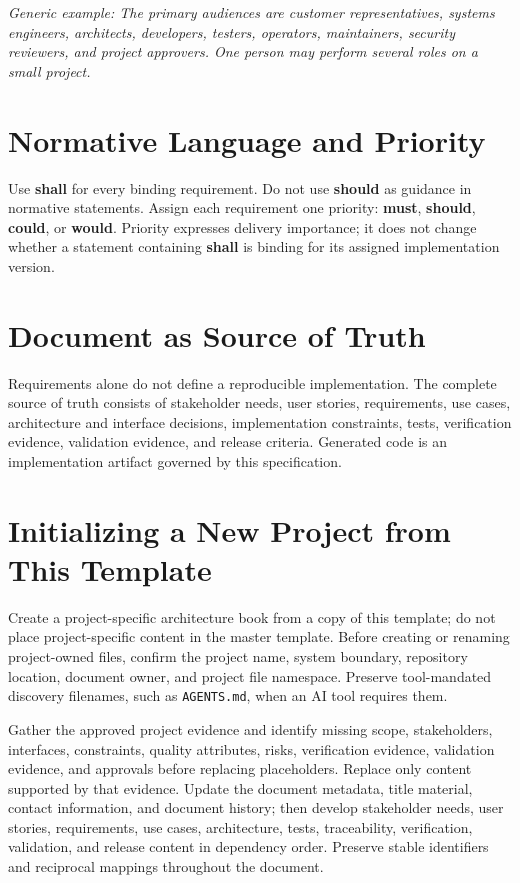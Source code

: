 \textit{Generic example: The primary audiences are customer representatives,
systems engineers, architects, developers, testers, operators, maintainers,
security reviewers, and project approvers. One person may perform several
roles on a small project.}

\section{Normative Language and Priority}
Use \textbf{shall} for every binding requirement. Do not use \textbf{should} as
guidance in normative statements. Assign each requirement one priority:
\textbf{\gls{must}}, \textbf{\gls{should}}, \textbf{\gls{could}}, or
\textbf{\gls{would}}. Priority expresses delivery importance; it does not change
whether a statement containing \textbf{shall} is binding for its assigned
implementation version.

\section{Document as Source of Truth}
Requirements alone do not define a reproducible implementation. The complete
source of truth consists of stakeholder needs, user stories, requirements, use
cases, architecture and interface decisions, implementation constraints,
tests, verification evidence, validation evidence, and release criteria.
Generated code is an implementation artifact governed by this specification.

\section{Initializing a New Project from This Template}
\label{Section:InitializeNewProject}
Create a project-specific architecture book from a copy of this template; do
not place project-specific content in the master template. Before creating or
renaming project-owned files, confirm the project name, system boundary,
repository location, document owner, and project file namespace. Preserve
tool-mandated discovery filenames, such as \texttt{AGENTS.md}, when an AI tool
requires them.

Gather the approved project evidence and identify missing scope, stakeholders,
interfaces, constraints, quality attributes, risks, verification evidence,
validation evidence, and approvals before replacing placeholders. Replace only
content supported by that evidence. Update the document metadata, title
material, contact information, and document history; then develop stakeholder
needs, user stories, requirements, use cases, architecture, tests,
traceability, verification, validation, and release content in dependency
order. Preserve stable identifiers and reciprocal mappings throughout the
document.

